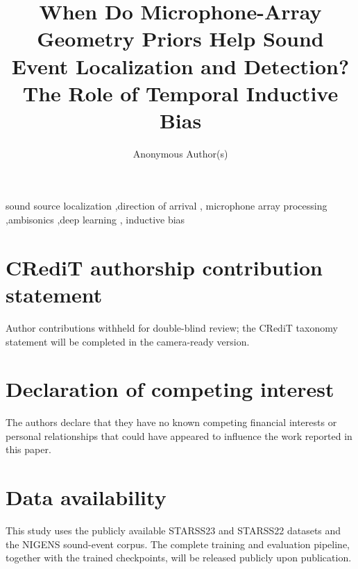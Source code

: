 \documentclass[preprint,review,12pt]{elsarticle}
\begin{document}
\begin{frontmatter}

\title{When Do Microphone-Array Geometry Priors Help Sound Event
Localization and Detection? The Role of Temporal Inductive Bias}

\author{Anonymous Author(s)}

\begin{abstract}

\end{abstract}

\begin{keyword}
sound source localization \sep direction of arrival \sep
microphone array processing \sep ambisonics \sep deep learning \sep
inductive bias
\end{keyword}

\end{frontmatter}










\section*{CRediT authorship contribution statement}
Author contributions withheld for double-blind review; the CRediT taxonomy
statement will be completed in the camera-ready version.

\section*{Declaration of competing interest}
The authors declare that they have no known competing financial interests or
personal relationships that could have appeared to influence the work reported
in this paper.

\section*{Data availability}
This study uses the publicly available STARSS23 and STARSS22 datasets and the
NIGENS sound-event corpus. The complete training and evaluation pipeline,
together with the trained checkpoints, will be released publicly upon
publication.



\end{document}
